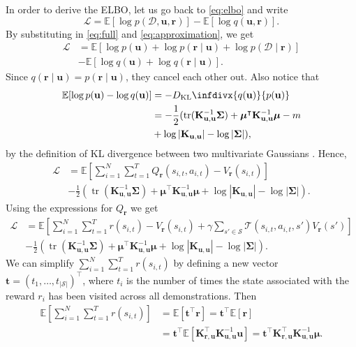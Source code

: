 \documentclass{mpaper}
\DeclareMathOperator{\tr}{tr}
\newcommand{\DKL}{D_{\mathrm{KL}}\infdivx}
\newcommand{\V}{V_{\mathbf{r}}}
\newcommand{\Kuu}{\mathbf{K}_{\mathbf{u},\mathbf{u}}}
\newcommand{\Kru}{\mathbf{K}_{\mathbf{r},\mathbf{u}}}
\newcommand{\pfull}{p(\mathcal{D}, \mathbf{u}, \mathbf{r})}
\newcommand{\approximation}{q(\mathbf{u}, \mathbf{r})}
\begin{document}
In order to derive the ELBO, let us go back to \eqref{eq:elbo} and
write
\[
  \mathcal{L} = \mathbb{E}[\log\pfull] - \mathbb{E}[\log\approximation].
\]
By substituting in \eqref{eq:full} and \eqref{eq:approximation}, we get
\begin{align*}
  \mathcal{L} &= \mathbb{E}[\log p(\mathbf{u}) + \log p(\mathbf{r} \mid \mathbf{u}) + \log p(\mathcal{D} \mid \mathbf{r})] \\
              &- \mathbb{E}[\log q(\mathbf{u}) + \log q(\mathbf{r} \mid \mathbf{u})].
\end{align*}
Since $q(\mathbf{r} \mid \mathbf{u}) = p(\mathbf{r} \mid \mathbf{u})$, they
cancel each other out. Also notice that
\begin{align*}
  \mathbb{E}[\log p(\mathbf{u}) - \log q(\mathbf{u})] &= -\DKL{q(\mathbf{u})}{p(\mathbf{u})} \\
                                                      &= -\frac{1}{2} (\tr (\Kuu^{-1}\bm\Sigma) + \bm\mu^\intercal\Kuu^{-1}\bm\mu - m \\
                                                      &+ \log |\Kuu| - \log |\bm\Sigma|),
\end{align*}
by the definition of KL divergence between two multivariate Gaussians
\cite{kl}. Hence,
\begin{align*}
  \mathcal{L} &= \mathbb{E}\left[ \sum_{i=1}^N \sum_{t=1}^T Q_{\mathbf{r}}(s_{i,t}, a_{i,t}) - \V(s_{i,t}) \right] \\
              &- \frac{1}{2} \left(\tr \left( \Kuu^{-1}\bm\Sigma \right) + \bm\mu^\intercal\Kuu^{-1}\bm\mu + \log |\Kuu| - \log |\bm\Sigma| \right).
\end{align*}
Using the expressions for $Q_{\mathbf{r}}$ we get
\begin{align*}
  \mathcal{L} &= \mathbb{E}\left[\sum_{i=1}^N \sum_{t=1}^T r(s_{i,t}) - \V(s_{i,t}) + \gamma\sum_{s' \in \mathcal{S}} \mathcal{T}(s_{i,t}, a_{i,t}, s')\V(s') \right] \\
              &- \frac{1}{2} \left(\tr \left( \Kuu^{-1}\bm\Sigma \right) + \bm\mu^\intercal\Kuu^{-1}\bm\mu + \log |\Kuu| - \log |\bm\Sigma| \right).
\end{align*}
We can simplify $\sum_{i=1}^N\sum_{t=1}^Tr(s_{i,t})$ by defining a new vector
$\mathbf{t} = (t_1, \dots, t_{|\mathcal{S}|})^\intercal$, where $t_i$ is the
number of times the state associated with the reward $r_i$ has been visited
across all demonstrations. Then
\begin{align*}
  \mathbb{E} \left[ \sum_{i=1}^N\sum_{t=1}^Tr(s_{i,t}) \right] &= \mathbb{E}[\mathbf{t}^\intercal\mathbf{r}] = \mathbf{t}^\intercal\mathbb{E}[\mathbf{r}] \\
                                                               &= \mathbf{t}^\intercal\mathbb{E}\left[\Kru^\intercal\Kuu^{-1}\mathbf{u}\right] = \mathbf{t}^\intercal\Kru^\intercal\Kuu^{-1}\bm\mu.
\end{align*}
\end{document}

